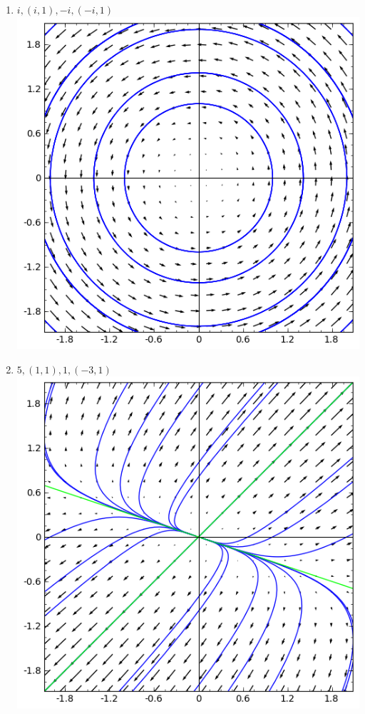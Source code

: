 {\begin{multicols}{2}
\begin{enumerate}
\begin{enumerate}
\item $i, (i,1),  -i, (-i,1)$\\\includegraphics[width=\myvfwidth]{Applications/support/vfc}
\item $5, (1,1),  1, (-3,1)$\\\includegraphics[width=\myvfwidth]{Applications/support/vfd}

\end{enumerate}
\end{enumerate}
\end{multicols}}
